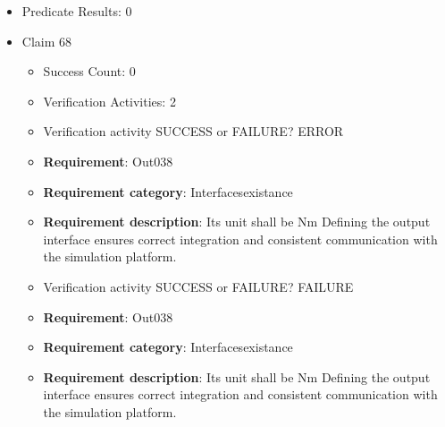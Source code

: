 \documentclass{article}
\begin{document}
\begin{itemize}
\begin{itemize}
						\item \textbf{Requirement}: Out037 
						\item \textbf{Requirement category}: Interfacesexistance 
						\item \textbf{Requirement description}: Its unit shall be noUnit Defining the output interface ensures correct integration and consistent communication with the simulation platform.
					
					\item Verification activity SUCCESS or FAILURE? SUCCESS
		
						\item \textbf{Requirement}: Out037 
						\item \textbf{Requirement category}: Interfacesexistance 
						\item \textbf{Requirement description}: Its unit shall be noUnit Defining the output interface ensures correct integration and consistent communication with the simulation platform.
					
				\end{itemize}
				
									    
				\item Predicate Results: 0

  				  \item Claim 68
				\begin{itemize}
			    	\item Success Count: 0 
			    	\item Verification Activities: 2
					\item Verification activity SUCCESS or FAILURE? ERROR
		
						\item \textbf{Requirement}: Out038 
						\item \textbf{Requirement category}: Interfacesexistance 
						\item \textbf{Requirement description}: Its unit shall be Nm Defining the output interface ensures correct integration and consistent communication with the simulation platform.
					
					\item Verification activity SUCCESS or FAILURE? FAILURE
		
						\item \textbf{Requirement}: Out038 
						\item \textbf{Requirement category}: Interfacesexistance 
						\item \textbf{Requirement description}: Its unit shall be Nm Defining the output interface ensures correct integration and consistent communication with the simulation platform.
					

\end{itemize}
\end{itemize}
\end{document}
